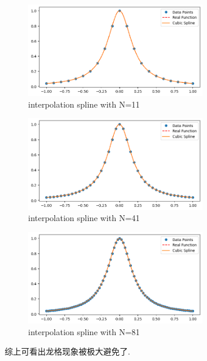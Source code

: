 \documentclass[a4paper]{article}
\begin{document}
\begin{figure}[H]
    \centering
    \includegraphics[width=0.7\textwidth]{N=21.png}
    \caption{interpolation spline with N=11}
    \label{Fig}
\end{figure}
\begin{figure}[H]
    \centering
    \includegraphics[width=0.7\textwidth]{N=41.png}
    \caption{interpolation spline with N=41}
    \label{Fig}
\end{figure}
\begin{figure}[H]
    \centering
    \includegraphics[width=0.7\textwidth]{N=81.png}
    \caption{interpolation spline with N=81}
    \label{Fig}
\end{figure}
综上可看出龙格现象被极大避免了.
\end{document}
